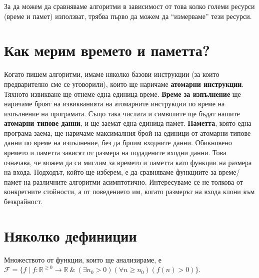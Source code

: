 \documentclass{article}
\newcommand{\R}{\mathbb{R}}
\newcommand{\F}{\mathcal{F}}
\theoremstyle{definition}
\theoremstyle{plain}
\theoremstyle{remark}
\theoremstyle{definition}
\begin{document}
За да можем да сравняваме алгоритми в зависимост от това колко големи ресурси (време и памет) използват, трябва първо да можем да ``измерваме'' тези ресурси.

\section*{Как мерим времето и паметта?}

Когато пишем алгоритми, имаме няколко базови инструкции (за които предварително сме се уговорили), които ще наричаме \textbf{атомарни инструкции}.
Тяхното извикване ще отнеме една единица време.
\textbf{Време за изпълнение} ще наричаме броят на извикванията на атомарните инструкции по време на изпълнение на програмата.
Също така числата и символите ще бъдат нашите \textbf{атомарни типове данни}, и ще заемат една единица памет.
\textbf{Паметта}, която една програма заема, ще наричаме максималния брой на единици от атомарни типове данни по време на изпълнение, без да броим входните данни.
Обикновено времето и паметта зависят от размера на подадените входни данни.
Това означава, че можем да си мислим за времето и паметта като функции на размера на входа.
Подходът, който ще изберем, е да сравняваме функциите за време/памет на различните алгоритми асимптотично.
Интересуваме се не толкова от конкретните стойности, а от поведението им, когато размерът на входа клони към безкрайност.

\section*{Няколко дефиниции}
Множеството от функции, които ще анализираме, е $\F = \{ f \mid f : \R^{\geq 0} \rightarrow \R \: \& \: (\exists n_0 > 0) (\forall n \geq n_0) (f(n) > 0) \}$.
\end{document}
